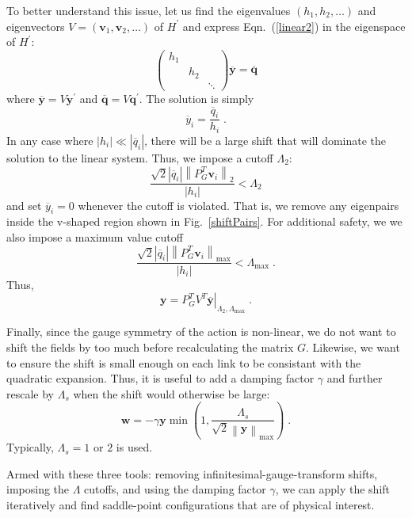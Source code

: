 \documentclass[preprint,aps,prd]{revtex4-2}
\newcommand{\be}{\begin{equation}}
\newcommand{\eq}{\end{equation}}
\newcommand{\heigen}{h}
\begin{document}
To better understand this issue, let us find the eigenvalues
$\left(\heigen_1, \heigen_2, \ldots\right)$ and
eigenvectors $V=\left(\mathbf{v}_1, \mathbf{v}_2, \ldots\right)$
of $H^\prime$ and express Eqn.~(\ref{linear2}) in the eigenspace of $H^\prime$:
\be
\begin{pmatrix}
    \heigen_1 & & \\
    & \heigen_2 & \\
    & & \ddots  \end{pmatrix} \overline{\mathbf{y}} =
  \overline{\mathbf{q}} \label{linear3}
\eq
where $\overline{\mathbf{y}} = V \mathbf{y}^\prime$ and
$\overline{\mathbf{q}}  = V \mathbf{q}^\prime$.
The solution is simply
\be
    \overline{y}_i = \frac{\overline{q}_i}{\heigen_i} \; .
\eq
In any case where $\left|\heigen_i\right|\ll
\left|\overline{q}_i\right|$,
there will be a large shift that will dominate the solution
to the linear system.
Thus, we impose a cutoff $\Lambda_2$:
\be
    \frac{\sqrt{2} \left|\overline{q}_i\right|\left\lVert P_G^T \mathbf{v}_i\right\rVert_2}{\left|\heigen_i\right|}
     < \Lambda_2 \label{lambda2}
\eq
%
and set $\overline{y}_i=0$ whenever the cutoff is violated.
That is, we remove any eigenpairs inside the v-shaped
region shown in Fig.~\ref{shiftPairs}.  For additional safety, we
we also impose a maximum value cutoff
\be
    \frac{\sqrt{2} \left|\overline{q}_i\right|
      \left\lVert P_G^T \mathbf{v}_i\right\rVert_\mathrm{max}}
    {\left|\heigen_i\right|}
    < \Lambda_\mathrm{max} \; .
\eq
Thus,
\be
      \mathbf{y} = P_G^T \left. V^T
                    \overline{\mathbf{y}}\right|_{\Lambda_2,\Lambda_\mathrm{max}} \; .
\eq

Finally, since the gauge symmetry of the action is non-linear,
we do not want to shift the fields by too much before recalculating
the matrix $G$.  Likewise, we want to ensure the shift is small
enough on each link to be consistant with the quadratic expansion.
Thus, it is useful to add a damping factor $\gamma$ and
further rescale by $\Lambda_s$ when the shift would
otherwise be large:
\be
  \mathbf{w} = - \gamma \mathbf{y} \min\left(1, \frac{\Lambda_s}{
    \sqrt{2} \left\lVert \mathbf{y}\right\rVert_\mathrm{max}}\right) \; .
\eq
Typically, $\Lambda_s = 1$ or $2$ is used.

Armed with these three tools:  removing infinitesimal-gauge-transform shifts,
imposing the $\Lambda$ cutoffs, and using the damping factor $\gamma$,
we can apply the shift iteratively and find saddle-point configurations
that are of physical interest.
\end{document}
